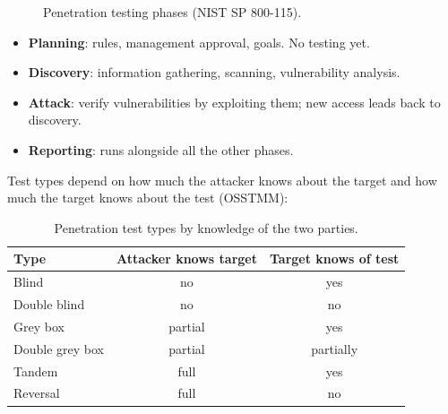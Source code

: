 \begin{figure}[H]
\centering
{}
\caption{Penetration testing phases (NIST SP 800-115).}
\label{fig:pt-phases}
\end{figure}

\begin{itemize}
    \item \textbf{Planning}: rules, management approval, goals. No testing yet.
    \item \textbf{Discovery}: information gathering, scanning, vulnerability analysis.
    \item \textbf{Attack}: verify vulnerabilities by exploiting them; new access leads back to discovery.
    \item \textbf{Reporting}: runs alongside all the other phases.
\end{itemize}

Test types depend on how much the attacker knows about the target and how much the target knows about the test (OSSTMM):

\begin{table}[H]
\centering
\caption{Penetration test types by knowledge of the two parties.}
\label{tab:pt-types}
\begin{tabular}{@{}lcc@{}}
\toprule
Type & Attacker knows target & Target knows of test \\
\midrule
Blind            & no      & yes \\
Double blind     & no      & no \\
Grey box         & partial & yes \\
Double grey box  & partial & partially \\
Tandem           & full    & yes \\
Reversal         & full    & no \\
\bottomrule
\end{tabular}
\end{table}


